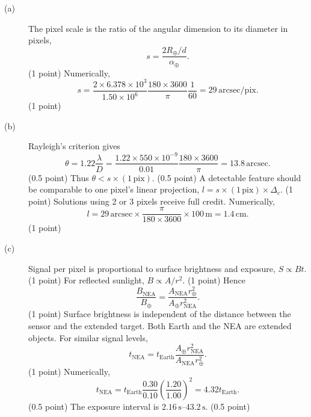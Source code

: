 \begin{description}
\item[(a)] The pixel scale is the ratio of the angular dimension to its diameter in pixels,
\[
s=\frac{2R_\oplus/d}{\alpha_\oplus}.
\]\hfill(1 point)
Numerically,
\[
s=\frac{2\times6.378\times10^3}{1.50\times10^6}\frac{180\times3600}{\pi}\frac1{60}=29\,\mathrm{arcsec/pix}.
\]\hfill(1 point)
\item[(b)] Rayleigh's criterion gives
\[
\theta=1.22\frac\lambda D=\frac{1.22\times550\times10^{-9}}{0.01}\frac{180\times3600}{\pi}=13.8\,\mathrm{arcsec}.
\]\hfill(0.5 point)
Thus $\theta<s\times(1\,\mathrm{pix})$. \hfill(0.5 point)
A detectable feature should be comparable to one pixel's linear projection, $l=s\times(1\,\mathrm{pix})\times\Delta_c$. \hfill(1 point)
Solutions using 2 or 3 pixels receive full credit. Numerically,
\[
l=29\,\mathrm{arcsec}\times\frac{\pi}{180\times3600}\times100\,\mathrm m=1.4\,\mathrm{cm}.
\]\hfill(1 point)
\item[(c)] Signal per pixel is proportional to surface brightness and exposure, $S\propto Bt$. \hfill(1 point)
For reflected sunlight, $B\propto A/r^2$. \hfill(1 point)
Hence
\[
\frac{B_{\mathrm{NEA}}}{B_\oplus}=\frac{A_{\mathrm{NEA}}r_\oplus^2}{A_\oplus r_{\mathrm{NEA}}^2}.
\]\hfill(1 point)
Surface brightness is independent of the distance between the sensor and the extended target. Both Earth and the NEA are extended objects. For similar signal levels,
\[
t_{\mathrm{NEA}}=t_{\mathrm{Earth}}\frac{A_\oplus r_{\mathrm{NEA}}^2}{A_{\mathrm{NEA}}r_\oplus^2}.
\]\hfill(1 point)
Numerically,
\[
t_{\mathrm{NEA}}=t_{\mathrm{Earth}}\frac{0.30}{0.10}\left(\frac{1.20}{1.00}\right)^2=4.32t_{\mathrm{Earth}}.
\]\hfill(0.5 point)
The exposure interval is $2.16\,\mathrm s$--$43.2\,\mathrm s$. \hfill(0.5 point)
\end{description}
